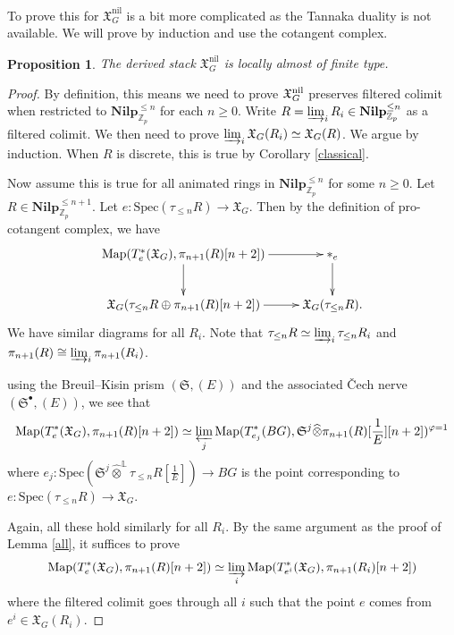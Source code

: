 \documentclass[10pt]{article}
\newtheorem{prop}[thm]{Proposition}
\numberwithin{equation}{section}
\newcommand{\frakS}{{\mathfrak S}}
\newcommand{\frakX}{{\mathfrak X}}
\newcommand{\bL}{{\mathbb L}}
\newcommand{\bZ}{{\mathbb Z}}
\newcommand{\Map}{\mathrm{Map}}
\newcommand{\nil}{\mathrm{nil}}
\newcommand{\Spec}{{\mathrm{Spec}}}         %
\begin{document}
To prove this for $\frakX_G^{\nil}$ is a bit more complicated as the Tannaka duality is not available. We will prove by induction and use the cotangent complex.

\begin{prop}
    The derived stack $\frakX_G^{\nil}$ is locally almost of finite type.
\end{prop}

\begin{proof}
     By definition, this means we need to prove $\frakX_G^{\rm nil}$ preserves filtered colimit when restricted to $\textbf{Nilp}_{\bZ_p}^{\leq n}$ for each $n\geq 0$.    Write $R=\varinjlim_iR_i\in\textbf{Nilp}_{\bZ_p}^{\leq n} $ as a filtered colimit. We then need to prove $\varinjlim_i\frakX_G(R_i)\simeq\frakX_G(R)$. We argue by induction. When $R$ is discrete, this is true by Corollary \ref{classical}. 
     
     Now assume this is true for all animated rings in $\textbf{Nilp}_{\bZ_p}^{\leq n}$ for some $n\geq 0$. Let $R\in \textbf{Nilp}_{\bZ_p}^{\leq n+1}$. Let $e:\Spec(\tau_{\leq n}R)\to \frakX_G$. Then by the definition of pro-cotangent complex, we have
     \begin{equation*}
         \xymatrix{
         \Map(T^*_e(\frakX_G),\pi_{n+1}(R)[n+2])\ar[r]\ar[d]& {*}_e\ar[d]\\
         \frakX_G(\tau_{\leq n}R\oplus\pi_{n+1}(R)[n+2])\ar[r]&\frakX_G(\tau_{\leq n}R).
         }
     \end{equation*}
     We have similar diagrams for all $R_i$. Note that $\tau_{\leq n}R\simeq \varinjlim_i\tau_{\leq n}R_i$ and $\pi_{n+1}(R)\cong \varinjlim_i\pi_{n+1}(R_i)$.

     using the Breuil--Kisin prism $(\frakS,(E))$ and the associated \v Cech nerve $(\frakS^{\bullet},(E))$, we see that
     \[
     \Map(T^*_e(\frakX_G),\pi_{n+1}(R)[n+2])\simeq \varprojlim_j\Map(T^*_{e_j}(BG),\frakS^j\widehat\otimes\pi_{n+1}(R)[\frac{1}{E}][n+2])^{\varphi=1}
     \]
     where $e_j:\Spec(\frakS^j\widehat\otimes^{\bL}\tau_{\leq n}R[\frac{1}{E}])\to BG$ is the point corresponding to $e:\Spec(\tau_{\leq n}R)\to \frakX_G$.

     Again, all these hold similarly for all $R_i$. By the same argument as the proof of Lemma \ref{all}, it suffices to prove
     \[
      \Map(T^*_e(\frakX_G),\pi_{n+1}(R)[n+2])\simeq \varinjlim_i \Map(T^*_{e^i}(\frakX_G),\pi_{n+1}(R_i)[n+2])
     \]
     where the filtered colimit goes through all $i$ such that the point $e$ comes from $e^i\in \frakX_G(R_i)$.


\end{proof}
\end{document}
